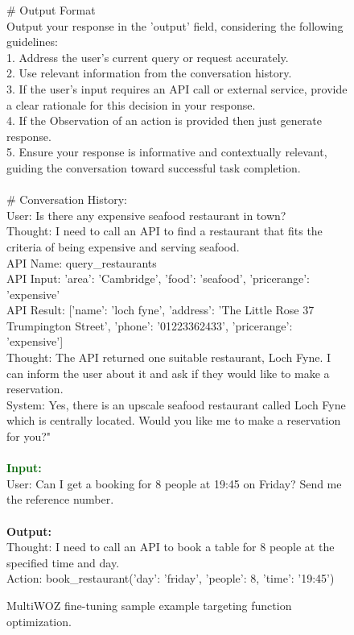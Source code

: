 \begin{figure*}[!h]
\begin{tcolorbox}[colback=gray!5!white,colframe=black!95!black,title=\textbf{\small{MultiWOZ Instruction Sample} | \textbf{Format:} Action Optimization}]
\# Output Format \\
Output your response in the 'output' field, considering the following guidelines: \\
1. Address the user's current query or request accurately. \\
2. Use relevant information from the conversation history. \\
3. If the user's input requires an API call or external service, provide a clear rationale for this decision in your response. \\
4. If the Observation of an action is provided then just generate response. \\
5. Ensure your response is informative and contextually relevant, guiding the conversation toward successful task completion. \\
 \\
\# Conversation History: \\
User: Is there any expensive seafood restaurant in town? \\
Thought: I need to call an API to find a restaurant that fits the criteria of being expensive and serving seafood. \\
API Name: query\_restaurants   \\
API Input: {'area': 'Cambridge', 'food': 'seafood', 'pricerange': 'expensive'}  \\
API Result: [{'name': 'loch fyne', 'address': 'The Little Rose 37 Trumpington Street', 'phone': '01223362433', 'pricerange': 'expensive'}] \\
Thought: The API returned one suitable restaurant, Loch Fyne. I can inform the user about it and ask if they would like to make a reservation.  \\
System: Yes, there is an upscale seafood restaurant called Loch Fyne which is centrally located. Would you like me to make a reservation for you?" \\
 \\
\small \textcolor{darkgreen}{\textbf{Input:}} \\
User: Can I get a booking for 8 people at 19:45 on Friday? Send me the reference number. \\
 \\
\small \textcolor{mypurple}{\textbf{Output:}} \\
Thought: I need to call an API to book a table for 8 people at the specified time and day. \\
Action: book\_restaurant({'day': 'friday', 'people': 8, 'time': '19:45'})\\
\end{tcolorbox}

\vspace{-0.25cm}
\caption{MultiWOZ fine-tuning sample example targeting function optimization.}
\label{tab:multiwoz-sft-action}
\end{figure*}

